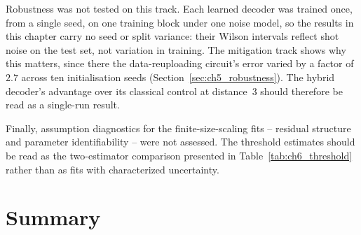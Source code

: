 \documentclass[Thesis.tex]{subfiles}
\begin{document}
Robustness was not tested on this track. Each learned decoder was trained once, from
a single seed, on one training block under one noise model, so the results in this
chapter carry no seed or split variance: their Wilson intervals reflect shot noise
on the test set, not variation in training. The mitigation track shows why this
matters, since there the data-reuploading circuit's error varied by a factor of
$2.7$ across ten initialisation seeds (Section~\ref{sec:ch5_robustness}). The hybrid
decoder's advantage over its classical control at distance~$3$ should therefore be
read as a single-run result.

Finally, assumption diagnostics for the finite-size-scaling fits -- residual
structure and parameter identifiability -- were not assessed. The threshold estimates
should be read as the two-estimator comparison presented in
Table~\ref{tab:ch6_threshold} rather than as fits with characterized uncertainty.

\section{Summary}\label{sec:ch6_summary}
\end{document}
